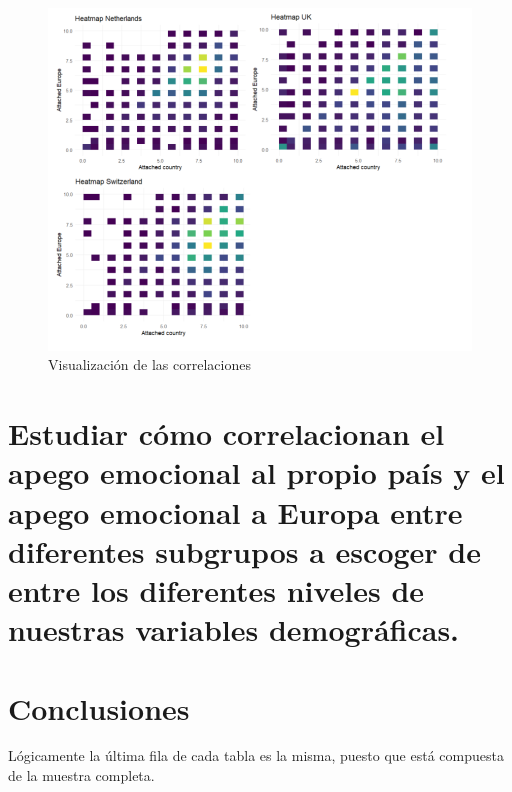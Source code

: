 \documentclass{article}
\begin{document}
 \begin{figure}[H]
 \centering
 \includegraphics[width=1\textwidth]{Imatge5.png}
 \caption{Visualización de las correlaciones}
 \end{figure}

\section{Estudiar cómo correlacionan el apego emocional al propio país y el apego emocional a Europa entre diferentes subgrupos a escoger de entre los diferentes niveles de nuestras variables demográficas.}

\section*{Conclusiones}

Lógicamente la última fila de cada tabla es la misma, puesto que está compuesta de la muestra completa.
\end{document}
